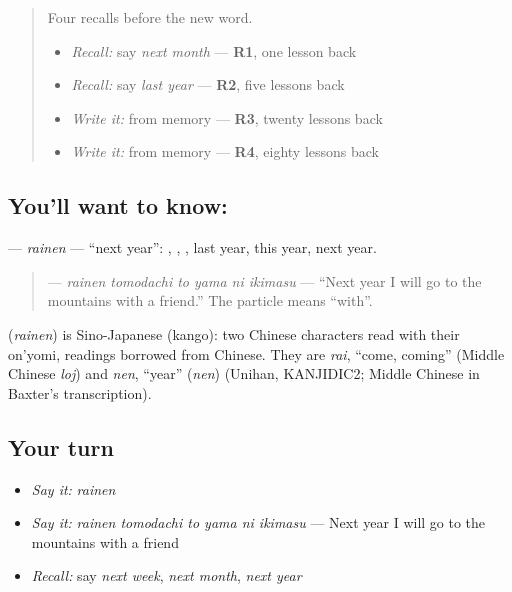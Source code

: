 \label{lesson:JA-C141-rainen}



\begin{quote}
Four recalls before the new word.

\begin{itemize}
\raggedright
  \item \emph{Recall:} say \emph{next month} — \textbf{R1}, one lesson back
  \item \emph{Recall:} say \emph{last year} — \textbf{R2}, five lessons back
  \item \emph{Write it:} \textbf{} from memory — \textbf{R3}, twenty lessons back
  \item \emph{Write it:} \textbf{} from memory — \textbf{R4}, eighty lessons back
\end{itemize}
\end{quote}

\subsection*{You'll want to know: }
\textbf{} — \emph{rainen} — \textquotedblleft{}next year\textquotedblright{}: \textbf{}, \textbf{}, \textbf{}, last year, this year, next year.

\begin{quote}
\textbf{   } — \emph{rainen tomodachi to yama ni ikimasu} — \textquotedblleft{}Next year I will go to the mountains with a friend.\textquotedblright{} The particle \textbf{} means \textquotedblleft{}with\textquotedblright{}.
\end{quote}

\begin{cousinweb}
\textbf{} (\emph{rainen}) is Sino-Japanese (kango): two Chinese characters read with their on'yomi, readings borrowed from Chinese. They are \emph{rai}, \textquotedblleft{}come, coming\textquotedblright{} (Middle Chinese \emph{loj}) and \emph{nen}, \textquotedblleft{}year\textquotedblright{} (\emph{nen}) (Unihan, KANJIDIC2; Middle Chinese in Baxter's transcription).
\end{cousinweb}

\subsection*{Your turn}
\begin{itemize}
\raggedright
  \item \emph{Say it:} \emph{rainen}
  \item \emph{Say it:} \emph{rainen tomodachi to yama ni ikimasu} — Next year I will go to the mountains with a friend
  \item \emph{Recall:} say \emph{next week}, \emph{next month}, \emph{next year}
\end{itemize}

